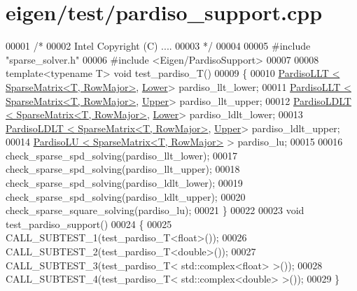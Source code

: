 \hypertarget{eigen_2test_2pardiso__support_8cpp_source}{}\section{eigen/test/pardiso\+\_\+support.cpp}
\label{eigen_2test_2pardiso__support_8cpp_source}

\begin{DoxyCode}
00001 \textcolor{comment}{/* }
00002 \textcolor{comment}{   Intel Copyright (C) ....}
00003 \textcolor{comment}{*/}
00004 
00005 \textcolor{preprocessor}{#include "sparse\_solver.h"}
00006 \textcolor{preprocessor}{#include <Eigen/PardisoSupport>}
00007 
00008 \textcolor{keyword}{template}<\textcolor{keyword}{typename} T> \textcolor{keywordtype}{void} test\_pardiso\_T()
00009 \{
00010   \hyperlink{class_eigen_1_1_pardiso_l_l_t}{PardisoLLT < SparseMatrix<T, RowMajor>}, 
      \hyperlink{group__enums_gga39e3366ff5554d731e7dc8bb642f83cda891792b8ed394f7607ab16dd716f60e6}{Lower}> pardiso\_llt\_lower;
00011   \hyperlink{class_eigen_1_1_pardiso_l_l_t}{PardisoLLT < SparseMatrix<T, RowMajor>}, 
      \hyperlink{group__enums_gga39e3366ff5554d731e7dc8bb642f83cda6bcb58be3b8b8ec84859ce0c5ac0aaec}{Upper}> pardiso\_llt\_upper;
00012   \hyperlink{class_eigen_1_1_pardiso_l_d_l_t}{PardisoLDLT < SparseMatrix<T, RowMajor>}, 
      \hyperlink{group__enums_gga39e3366ff5554d731e7dc8bb642f83cda891792b8ed394f7607ab16dd716f60e6}{Lower}> pardiso\_ldlt\_lower;
00013   \hyperlink{class_eigen_1_1_pardiso_l_d_l_t}{PardisoLDLT < SparseMatrix<T, RowMajor>}, 
      \hyperlink{group__enums_gga39e3366ff5554d731e7dc8bb642f83cda6bcb58be3b8b8ec84859ce0c5ac0aaec}{Upper}> pardiso\_ldlt\_upper;
00014   \hyperlink{class_eigen_1_1_pardiso_l_u}{PardisoLU  < SparseMatrix<T, RowMajor>} > pardiso\_lu;
00015 
00016   check\_sparse\_spd\_solving(pardiso\_llt\_lower);
00017   check\_sparse\_spd\_solving(pardiso\_llt\_upper);
00018   check\_sparse\_spd\_solving(pardiso\_ldlt\_lower);
00019   check\_sparse\_spd\_solving(pardiso\_ldlt\_upper);
00020   check\_sparse\_square\_solving(pardiso\_lu);
00021 \}
00022 
00023 \textcolor{keywordtype}{void} test\_pardiso\_support()
00024 \{
00025   CALL\_SUBTEST\_1(test\_pardiso\_T<float>());
00026   CALL\_SUBTEST\_2(test\_pardiso\_T<double>());
00027   CALL\_SUBTEST\_3(test\_pardiso\_T< std::complex<float> >());
00028   CALL\_SUBTEST\_4(test\_pardiso\_T< std::complex<double> >());
00029 \}
\end{DoxyCode}
